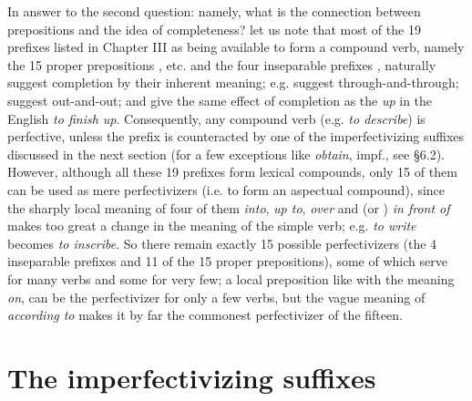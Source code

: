 In answer to the second question: namely, what is the connection between prepositions and the idea of completeness? let us note that most of the 19 prefixes listed in Chapter III as being available to form a compound verb, namely the 15 proper prepositions , etc. and the four inseparable prefixes , naturally suggest completion by their inherent meaning; e.g.  suggest through-and-through;  suggest out-and-out; and  give the same effect of completion as the \emph{up} in the English \emph{to finish up}. Consequently, any compound verb (e.g.  \emph{to describe}) is perfective, unless the prefix is counteracted by one of the imperfectivizing suffixes discussed in the next section (for a few exceptions like  \emph{obtain}, impf., see §6.2). However, although all these 19 prefixes form lexical compounds, only 15 of them can be used as mere perfectivizers (i.e. to form an aspectual compound), since the sharply local meaning of four of them  \emph{into},  \emph{up to},  \emph{over} and  (or ) \emph{in front of} makes too great a change in the meaning of the simple verb; e.g.  \emph{to write} becomes  \emph{to inscribe}. So there remain exactly 15 possible perfectivizers (the 4 inseparable prefixes and 11 of the 15 proper prepositions), some of which serve for many verbs and some for very few; a local preposition like  with the meaning \emph{on}, can be the perfectivizer for only a few verbs, but the vague meaning of  \emph{according to} makes it by far the commonest perfectivizer of the fifteen.

\section{The imperfectivizing suffixes}

